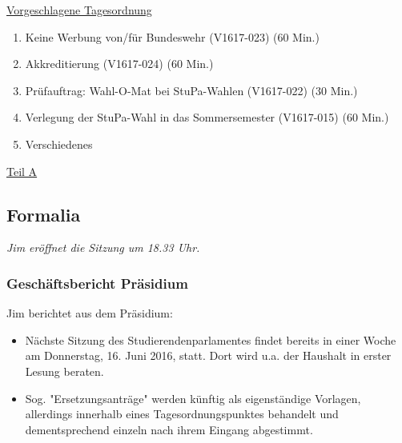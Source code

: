 \documentclass[ngerman,headheight=70pt]{scrartcl}
\begin{document}
    \newpage
    \underline{Vorgeschlagene Tagesordnung}
    \begin{enumerate}[label={\textbf{Top \theenumi}},leftmargin=*]
        \item Keine Werbung von/für Bundeswehr (V1617-023) (60 Min.)
        \item Akkreditierung (V1617-024) (60 Min.)
        \item Prüfauftrag: Wahl-O-Mat bei StuPa-Wahlen (V1617-022) (30 Min.)
        \item Verlegung der StuPa-Wahl in das Sommersemester (V1617-015) (60 Min.)
        \item Verschiedenes
    \end{enumerate}

    \newpage


    {\Large \underline{Teil A}}

    \subsection{Formalia}

    \textit{Jim eröffnet die Sitzung um 18.33 Uhr.}

    \subsubsection{Geschäftsbericht Präsidium}

    Jim berichtet aus dem Präsidium:
    \begin{itemize}
        \item Nächste Sitzung des Studierendenparlamentes findet bereits in einer
        Woche am Donnerstag, 16. Juni 2016, statt. Dort wird u.a. der Haushalt in
        erster Lesung beraten.
        \item Sog. "Ersetzungsanträge" werden künftig als eigenständige Vorlagen,
        allerdings innerhalb eines Tagesordnungspunktes behandelt und dementsprechend
        einzeln nach ihrem Eingang abgestimmt.
    \end{itemize}
\end{document}
